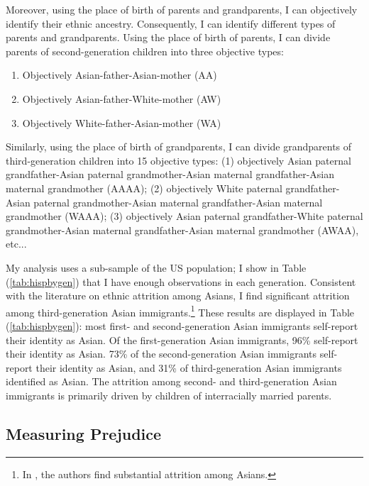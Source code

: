 Moreover, using the place of birth of parents and grandparents, I can objectively identify their ethnic ancestry. Consequently, I can identify different types of parents and grandparents. Using the place of birth of parents, I can divide parents of second-generation children into three objective types: 
\begin{enumerate}
\item Objectively Asian-father-Asian-mother (AA)
\item Objectively Asian-father-White-mother (AW)
\item Objectively White-father-Asian-mother (WA)
\end{enumerate}

Similarly, using the place of birth of grandparents, I can divide grandparents of third-generation children into 15 objective types: (1) objectively Asian paternal grandfather-Asian paternal grandmother-Asian maternal grandfather-Asian maternal grandmother (AAAA); (2) objectively White paternal grandfather-Asian paternal grandmother-Asian maternal grandfather-Asian maternal grandmother (WAAA); (3) objectively Asian paternal grandfather-White paternal grandmother-Asian maternal grandfather-Asian maternal grandmother (AWAA), etc...

My analysis uses a sub-sample of the US population; I show in Table (\ref{tab:hispbygen}) that I have enough observations in each generation. Consistent with the literature on ethnic attrition among Asians, I find significant attrition among third-generation Asian immigrants.\footnote{In \textcite{duncanIdentifyingLaterGenerationDescendants2018,duncanSocioeconomicIntegrationImmigrant2018, antmanEthnicAttritionObserved2016,antmanEthnicAttritionAssimilation2020}, the authors find substantial attrition among Asians.} These results are displayed in Table (\ref{tab:hispbygen}): most first- and second-generation Asian immigrants self-report their identity as Asian. Of the first-generation Asian immigrants, 96\% self-report their identity as Asian. 73\% of the second-generation Asian immigrants self-report their identity as Asian, and 31\% of third-generation Asian immigrants identified as Asian. The attrition among second- and third-generation Asian immigrants is primarily driven by children of interracially married parents.

\subsection{Measuring Prejudice}


